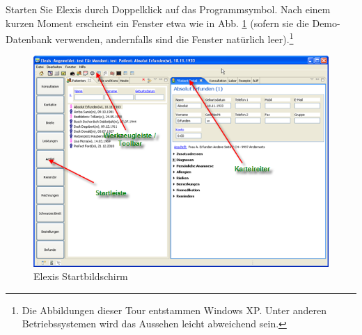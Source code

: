 
Starten Sie Elexis durch Doppelklick auf das Programmsymbol.
Nach einem kurzen Moment erscheint ein Fenster etwa wie in Abb. \ref{fig:startbild} (sofern sie die
Demo-Datenbank verwenden, andernfalls sind die Fenster natürlich
leer).\footnote{Die Abbildungen dieser Tour entstammen Windows XP. Unter anderen Betriebssystemen wird das Aussehen leicht abweichend sein.}
 \begin{figure}[ht]
	\includegraphics{images/einf0}
	\caption{Elexis Startbildschirm}
	\label{fig:startbild}
\end{figure}
